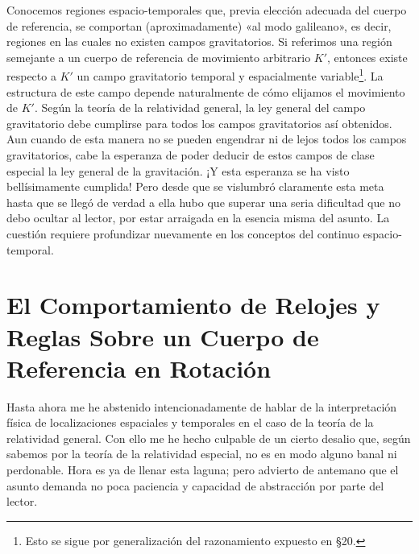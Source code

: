 \documentclass[spanish]{book}
\begin{document}
Conocemos regiones espacio-temporales que, previa elección adecuada del cuerpo de
referencia, se comportan (aproximadamente) «al modo galileano», es decir, regiones en
las cuales no existen campos gravitatorios. Si referimos una región semejante a un
cuerpo de referencia de movimiento arbitrario $K'$, entonces existe respecto a $K'$ un
campo gravitatorio temporal y espacialmente variable\footnote{Esto se sigue por 
generalización del razonamiento expuesto en \S 20.}. La estructura de este campo
depende naturalmente de cómo elijamos el movimiento de $K'$. Según la teoría de la
relatividad general, la ley general del campo gravitatorio debe cumplirse para todos los
campos gravitatorios así obtenidos. Aun cuando de esta manera no se pueden
engendrar ni de lejos todos los campos gravitatorios, cabe la esperanza de poder
deducir de estos campos de clase especial la ley general de la gravitación. ¡Y esta
esperanza se ha visto bellísimamente cumplida! Pero desde que se vislumbró
claramente esta meta hasta que se llegó de verdad a ella hubo que superar una seria
dificultad que no debo ocultar al lector, por estar arraigada en la esencia misma
del asunto. La cuestión requiere profundizar nuevamente en los conceptos del
continuo espacio-temporal.


\chapter{El Comportamiento de Relojes y Reglas Sobre un Cuerpo de Referencia en Rotación}

Hasta ahora me he abstenido intencionadamente de hablar de la interpretación física
de localizaciones espaciales y temporales en el caso de la teoría de la relatividad
general. Con ello me he hecho culpable de un cierto desalio que, según sabemos
por la teoría de la relatividad especial, no es en modo alguno banal ni perdonable. Hora
es ya de llenar esta laguna; pero advierto de antemano que el asunto demanda no
poca paciencia y capacidad de abstracción por parte del lector.
\end{document}
